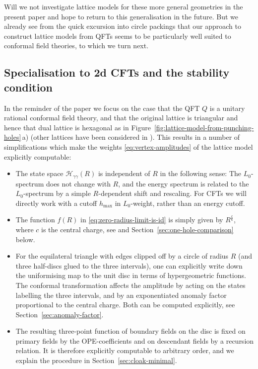 \documentclass[11pt,a4paper]{article}
\numberwithin{equation}{section}
\begin{document}
Will we not investigate lattice models for these more general geometries in the present paper and hope to return to this generalisation in the future. But we already see from the quick excursion into circle packings that our approach to construct lattice models from QFTs seems to be particularly well suited to conformal field theories, to which we turn next.

\subsection{Specialisation to 2d CFTs and the stability condition}
\label{sec:CFT-hexagonal}

In the reminder of the paper we focus on the case that the QFT $Q$ is a unitary rational conformal field theory, and that the original lattice is triangular and hence that dual lattice is hexagonal as in Figure~\ref{fig:lattice-model-from-punching-holes}\,a) (other lattices have been considered in \cite{Cheng:2023kxh}).
This results in a number of simplifications which make the weights \eqref{eq:vertex-amplitudes} of the lattice model explicitly computable:
\begin{itemize}
    \item The state space $\mathcal{H}_{\gamma\gamma}(R)$ is independent of $R$ in the following sense: The $L_0$-spectrum does not change with $R$, and the energy spectrum is related to the $L_0$-spectrum by a simple $R$-dependent shift and rescaling. For CFTs we will directly work with a cutoff $h_\mathrm{max}$ in $L_0$-weight, rather than an energy cutoff.

    \item The function $f(R)$ in \eqref{eq:zero-radius-limit-is-id} is simply given by $R^{\frac{c}{6}}$, where $c$ is the central charge, see \cite[Sec.\,5.1]{Brehm:2021wev}
    and Section~\ref{sec:one-hole-comparison} below.

    \item For the equilateral triangle with edges clipped off by a circle of radius $R$ (and three half-discs glued to the three intervals), one can explicitly write down the uniformising map to the unit disc in terms of hypergeometric functions. 
    The conformal transformation affects the amplitude by acting on the states labelling the three intervals, and by an exponentiated anomaly factor proportional to the central charge. Both can be computed explicitly, see Section~\ref{sec:anomaly-factor}.

    \item The resulting three-point function of boundary fields on the disc is fixed on primary fields by the OPE-coefficients and on descendant fields by a recursion relation. It is therefore explicitly computable to arbitrary order, and we explain the procedure in Section~\ref{sec:cloak-minimal}.

\end{itemize}
\end{document}
